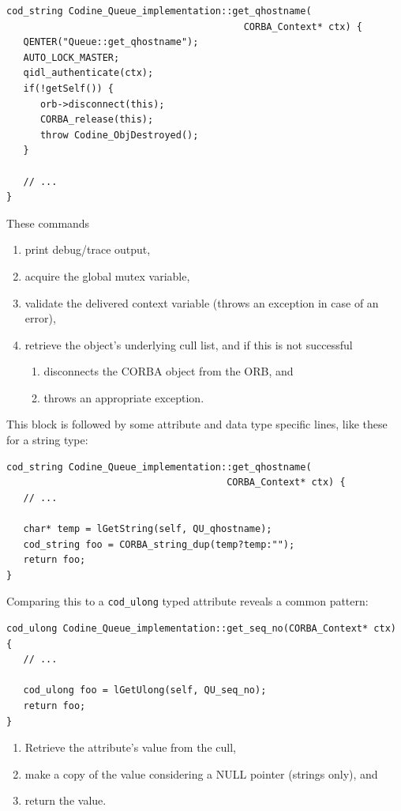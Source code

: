 \begin{Verbatim}[fontsize=\small, frame=single]
cod_string Codine_Queue_implementation::get_qhostname(
                                          CORBA_Context* ctx) {
   QENTER("Queue::get_qhostname");
   AUTO_LOCK_MASTER;
   qidl_authenticate(ctx);
   if(!getSelf()) {
      orb->disconnect(this);
      CORBA_release(this);
      throw Codine_ObjDestroyed();
   }

   // ...
}
\end{Verbatim}

These commands
\begin{enumerate}
\item print debug/trace output,
\item acquire the global mutex variable,
\item validate the delivered context variable (throws an exception in case
      of an error),
\item retrieve the object's underlying cull list, and if this is not
      successful
   \begin{enumerate}
   \item disconnects the CORBA object from the ORB, and
   \item throws an appropriate exception.
   \end{enumerate}
\end{enumerate}

This block is followed by some attribute and data type specific lines, like
these for a string type:

\begin{Verbatim}[fontsize=\small, frame=single]
cod_string Codine_Queue_implementation::get_qhostname(
                                       CORBA_Context* ctx) {
   // ...

   char* temp = lGetString(self, QU_qhostname);
   cod_string foo = CORBA_string_dup(temp?temp:"");
   return foo;
}
\end{Verbatim}

Comparing this to a \texttt{cod\_ulong} typed attribute reveals a common
pattern:

\begin{Verbatim}[fontsize=\small, frame=single]
cod_ulong Codine_Queue_implementation::get_seq_no(CORBA_Context* ctx) {
   // ...

   cod_ulong foo = lGetUlong(self, QU_seq_no);
   return foo;
}
\end{Verbatim}

\begin{enumerate}
\item Retrieve the attribute's value from the cull,
\item make a copy of the value considering a NULL pointer (strings only), and
\item return the value.
\end{enumerate}

